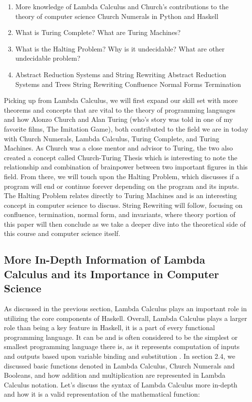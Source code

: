 \documentclass{article}
\begin{document}
\begin{enumerate}
    \item More knowledge of Lambda Calculus and Church's contributions to the theory of computer science
        Church Numerals in Python and Haskell
    \item What is Turing Complete?
         What are Turing Machines?
    \item What is the Halting Problem? 
         Why is it undecidable? 
         What are other undecidable problem?
    \item Abstract Reduction Systems and String Rewriting
        Abstract Reduction Systems and Trees
        String Rewriting
            \subsubitem{ -  }Confluence
            \subsubitem{ -  }Normal Forms
            \subsubitem{ -  }Termination
\end{enumerate}

\medskip\noindent
Picking up from Lambda Calculus, we will first expand our skill set with more theorems and concepts that are vital to the theory of programming languages and how Alonzo Church and Alan Turing (who's story was told in one of my favorite films, The Imitation Game), both contributed to the field we are in today with Church Numerals, Lambda Calculus, Turing Complete, and Turing Machines. As Church was a close mentor and advisor to Turing, the two also created a concept called Church-Turing Thesis which is interesting to note the relationship and combination of brainpower between two important figures in this field. From there, we will touch upon the Halting Problem, which discusses if a program will end or continue forever depending on the program and its inputs. The Halting Problem relates directly to Turing Machines and is an interesting concept in computer science to discuss. String Rewriting will follow, focusing on confluence, termination, normal form, and invariants, where theory portion of this paper will then conclude as we take a deeper dive into the theoretical side of this course and computer science itself.

\subsection{More In-Depth Information of Lambda Calculus and its Importance in Computer Science}

As discussed in the previous section, Lambda Calculus plays an important role in utilizing the core components of Haskell. Overall, Lambda Calculus plays a larger role than being a key feature in Haskell, it is a part of every functional programming language. It can be and is often considered to be the simplest or smallest programming language there is, as it represents computation of inputs and outputs based upon variable binding and substitution \cite{JRebel}. In section 2.4, we discussed basic functions denoted in Lambda Calculus, Church Numerals and Booleans, and how addition and multiplication are represented in Lambda Calculus notation. Let's discuss the syntax of Lambda Calculus more in-depth and how it is a valid representation of the mathematical function:
\end{document}
